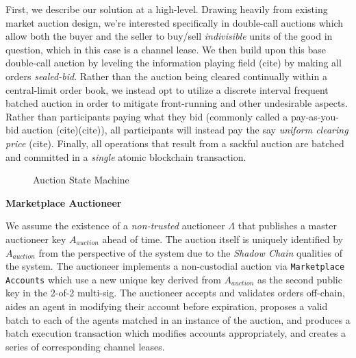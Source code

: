 \documentclass[12pt,a4paper]{article}
\theoremstyle{definition}
\begin{document}
First, we describe our solution at a high-level. Drawing heavily from existing
market auction design, we're interested specifically in double-call auctions
which allow both the buyer and the seller to buy/sell \emph{indivisible} units
of the good in question, which in this case is a channel lease. We then build
upon this base double-call auction by leveling the information playing field
(cite) by making all orders \emph{sealed-bid}. Rather than the auction being
cleared continually within a central-limit order book, we instead opt to
utilize a discrete interval frequent batched auction in order to mitigate
front-running and other undesirable aspects. Rather than participants paying
what they bid (commonly called a pay-as-you-bid auction (cite)(cite)), all
participants will instead pay the say \emph{uniform clearing price} (cite).
Finally, all operations that result from a sackful auction are batched and
committed in a \emph{single} atomic blockchain transaction.

\clearpage

\begin{figure}[!htb]


\caption{Auction State Machine}

\end{figure}


\begin{center}
    \textbf{Marketplace Auctioneer}
\end{center}

We assume the existence of a \emph{non-trusted} auctioneer $\Lambda$ that
publishes a master auctioneer key $A_{auction}$ ahead of time. The auction
itself is uniquely identified by $A_{auction}$ from the perspective of the
system due to the \emph{Shadow Chain} qualities of the system. The auctioneer
implements a non-custodial auction via \texttt{Marketplace Accounts} which use
a new unique key derived from $A_{auction}$ as the second public key in the
2-of-2 multi-sig. The auctioneer accepts and validates orders off-chain, aides
an agent in modifying their account before expiration, proposes a valid batch
to each of the agents matched in an instance of the auction, and produces a
batch execution transaction which modifies accounts appropriately, and creates
a series of corresponding channel leases.
\end{document}
